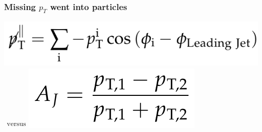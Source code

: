 \documentclass[compress]{beamer}
\begin{document}
\begin{frame}
\frametitle{Missing $p_T$ went into  particles}

\vspace{0.1 cm}
\includegraphics[height=0.7 cm]{dijets/ptmiss_parallel.png}\hspace{0.3 cm}$\begin{array}{c}\mbox{versus} \\ \mbox{ }\end{array}$\hspace{0.3 cm}\includegraphics[height=0.7 cm]{dijets/aj_definition.png}


\end{frame}
\end{document}
